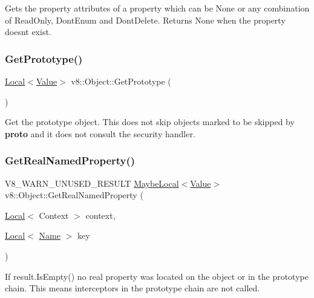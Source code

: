 Gets the property attributes of a property which can be None or any combination of Read\+Only, Dont\+Enum and Dont\+Delete. Returns None when the property doesn\textquotesingle{}t exist. \mbox{\label{classv8_1_1Object_ae8d3fed7d6dbd667c29cabb3039fe7af}} 
\subsubsection{\texorpdfstring{Get\+Prototype()}{GetPrototype()}}
{\footnotesize\ttfamily \mbox{\hyperlink{classv8_1_1Local}{Local}}$<$\mbox{\hyperlink{classv8_1_1Value}{Value}}$>$ v8\+::\+Object\+::\+Get\+Prototype (\begin{DoxyParamCaption}{ }\end{DoxyParamCaption})}

Get the prototype object. This does not skip objects marked to be skipped by {\bfseries proto} and it does not consult the security handler. \mbox{\label{classv8_1_1Object_aecec39cefb3e394e1696fe618862efec}} 
\subsubsection{\texorpdfstring{Get\+Real\+Named\+Property()}{GetRealNamedProperty()}}
{\footnotesize\ttfamily V8\+\_\+\+W\+A\+R\+N\+\_\+\+U\+N\+U\+S\+E\+D\+\_\+\+R\+E\+S\+U\+LT \mbox{\hyperlink{classv8_1_1MaybeLocal}{Maybe\+Local}}$<$\mbox{\hyperlink{classv8_1_1Value}{Value}}$>$ v8\+::\+Object\+::\+Get\+Real\+Named\+Property (\begin{DoxyParamCaption}\item[{\mbox{\hyperlink{classv8_1_1Local}{Local}}$<$ Context $>$}]{context,  }\item[{\mbox{\hyperlink{classv8_1_1Local}{Local}}$<$ \mbox{\hyperlink{classv8_1_1Name}{Name}} $>$}]{key }\end{DoxyParamCaption})}

If result.\+Is\+Empty() no real property was located on the object or in the prototype chain. This means interceptors in the prototype chain are not called. \mbox{\label{classv8_1_1Object_a476c21f05ffc519252fad0ab46de33d7}} 
